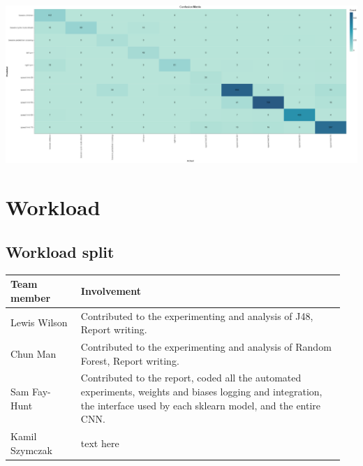 \documentclass[11pt]{article}
\begin{document}
\begin{center}
  \includegraphics [width = \textwidth, height = 0.3\textheight, keepaspectratio]{Images/LRConfMat.png}
\end{center}

\pagebreak
\appendix
\appendixpage
\addappheadtotoc

\section{Workload}


\subsection{Workload split}
  
  \begin{table}[ht]
    \centering
    \begin{tabular}{|p{0.2\linewidth} | p{0.75\linewidth}|} 
      \hline
      \textbf{Team member}  & \textbf{Involvement} \\ \hline
      Lewis Wilson & Contributed to the experimenting and analysis of J48, Report writing. \\ \hline
      Chun Man & Contributed to the experimenting and analysis of Random Forest, Report writing. \\ \hline
      Sam Fay-Hunt & Contributed to the report, coded all the automated experiments, weights and biases logging and integration, the interface used by each sklearn model, and the entire CNN. \\ \hline
      Kamil Szymczak & text here \\ \hline
    \end{tabular}
  \end{table}\label{ContributionTab}
\end{document}

